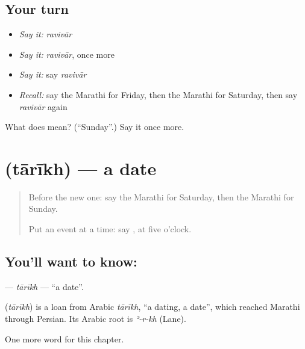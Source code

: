 \subsection*{Your turn}
\begin{itemize}
\raggedright
  \item \emph{Say it:} \emph{ravivār}
  \item \emph{Say it:} \emph{ravivār}, once more
  \item \emph{Say it:} say \emph{ravivār}
  \item \emph{Recall:} say the Marathi for Friday, then the Marathi for Saturday, then say \emph{ravivār} again
\end{itemize}

\begin{tcolorbox}[breakable,colback=teal!4,colframe=teal!35!black,title={Before you move on}]
What does  mean? (\textquotedblleft{}Sunday\textquotedblright{}.) Say it once more.
\end{tcolorbox}
\section[\texorpdfstring{\mr{तारीख} (tārīkh)}{तारीख (tārīkh)}]{ (tārīkh) — a date}

\label{lesson:MR-C126-tarikh}



\begin{quote}
Before the new one: say the Marathi for Saturday, then the Marathi for Sunday.

Put an event at a time: say \textbf{ }, at five o'clock.
\end{quote}

\subsection*{You'll want to know: }
\textbf{} — \emph{tārīkh} — \textquotedblleft{}a date\textquotedblright{}.

\begin{cousinweb}
\textbf{} (\emph{tārīkh}) is a loan from Arabic \emph{tārīkh}, \textquotedblleft{}a dating, a date\textquotedblright{}, which reached Marathi through Persian. Its Arabic root is \emph{ʾ-r-kh} (Lane).
\end{cousinweb}

\begin{grammarlens}[title={What you've built}]
One more word for this chapter.
\end{grammarlens}


